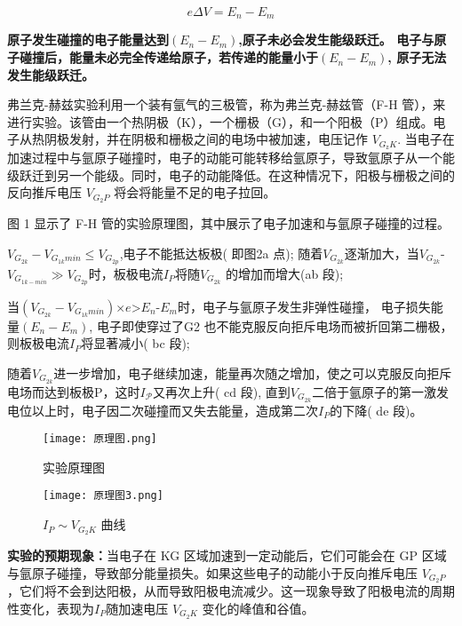 \documentclass[dvipsnames, svgnames,a4paper,11pt]{article}
\begin{document}
$$
e\Delta V=E_n-E_m
$$

\textbf{原子发生碰撞的电子能量达到$(E_n-E_m)$,原子未必会发生能级跃迁。
电子与原子碰撞后，能量未必完全传递给原子，若传递的能量小于$(E_n-E_m)$, 原子无法发生能级跃迁。
}


弗兰克-赫兹实验利用一个装有氩气的三极管，称为弗兰克-赫兹管（F-H 管），来进行实验。该管由一个热阴极（K），一个栅极（G），和一个阳极（P）组成。电子从热阴极发射，并在阴极和栅极之间的电场中被加速，电压记作 $V_{G_\mathrm{z}K}$. 当电子在加速过程中与氩原子碰撞时，电子的动能可能转移给氩原子，导致氩原子从一个能级跃迁到另一个能级。同时，电子的动能降低。在这种情况下，阳极与栅极之间的反向推斥电压 $V_{G_2P}$ 将会将能量不足的电子拉回。

图 1 显示了 F-H 管的实验原理图，其中展示了电子加速和与氩原子碰撞的过程。

$V_{G_{2k}}-V_{G_{1k}min}\leqslant V_{G_{2p}}$,电子不能抵达板极( 即图2a 点);
随着$V_{G_{2k}}$逐渐加大，当$V_{G_{2k}}$-$V_{G_{1k-min}}\gg V_{G_{2p}}$时，板极电流$I_{P}$将随$V_{G_{2k}}$ 的增加而增大(ab 段);

当$(V_{G_{2k}}-V_{G_{1k}min})$$\times e$>$E_n$-$E_m$时，电子与氩原子发生非弹性碰撞， 电子损失能量$(E_n-E_m)$, 电子即使穿过了G2 也不能克服反向拒斥电场而被折回第二栅极，则板极电流$I_P$将显著减小( bc 段);

随着$V_{G_{2k}}$进一步增加，电子继续加速，能量再次随之增加，使之可以克服反向拒斥电场而达到板极P，这时$I_{\mathcal{P}}$又再次上升( cd 段), 直到$V_{G_{2k}}$二倍于氩原子的第一激发电位以上时，电子因二次碰撞而又失去能量，造成第二次$I_{P}$的下降( de 段)。





\begin{figure}[H]
	\centering
	\begin{minipage}{0.25\textwidth} %
		\centering
		\texttt{[image: 原理图.png]} %
		\caption{实验原理图}
	\end{minipage}
	\begin{minipage}{0.55\textwidth} %
		\centering
		\texttt{[image: 原理图3.png]} %
		\caption{$I_P{\sim}V_{G_2K}$ 曲线}
	\end{minipage}
\end{figure}

\textbf{实验的预期现象：}当电子在 KG 区域加速到一定动能后，它们可能会在 GP 区域与氩原子碰撞，导致部分能量损失。如果这些电子的动能小于反向推斥电压 $V_{G_2P}$，它们将不会到达阳极，从而导致阳极电流减少。这一现象导致了阳极电流的周期性变化，表现为$I_{P}$随加速电压 $V_{G_2K}$ 变化的峰值和谷值。
\end{document}
